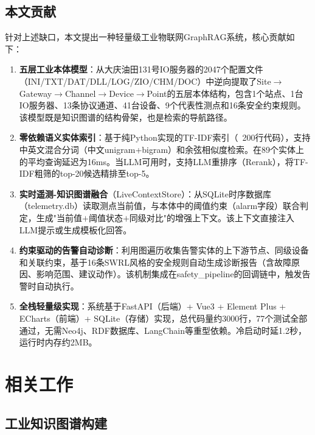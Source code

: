 \documentclass[12pt,a4paper]{article}
\begin{document}
\subsection{本文贡献}

针对上述缺口，本文提出一种轻量级工业物联网GraphRAG系统，核心贡献如下：

\begin{enumerate}
  \item \textbf{五层工业本体模型}：从大庆油田131号IO服务器的2047个配置文件（INI/TXT/DAT/DLL/LOG/ZIO/CHM/DOC）中逆向提取了Site$\to$Gateway$\to$Channel$\to$Device$\to$Point的五层本体结构，包含1个站点、1台IO服务器、13条协议通道、41台设备、9个代表性测点和16条安全约束规则。该模型既是知识图谱的结构骨架，也是检索的导航路径。

  \item \textbf{零依赖语义实体索引}：基于纯Python实现的TF-IDF索引（~200行代码），支持中英文混合分词（中文unigram+bigram）和余弦相似度检索。在89个实体上的平均查询延迟为16ms。当LLM可用时，支持LLM重排序（Rerank），将TF-IDF粗筛的top-20候选精排至top-5。

  \item \textbf{实时遥测-知识图谱融合}（LiveContextStore）：从SQLite时序数据库（telemetry.db）读取测点当前值，与本体中的阈值约束（alarm字段）联合判定，生成"当前值$+$阈值状态$+$同级对比"的增强上下文。该上下文直接注入LLM提示或生成模板化回答。

  \item \textbf{约束驱动的告警自动诊断}：利用图遍历收集告警实体的上下游节点、同级设备和关联约束，基于16条SWRL风格的安全规则自动生成诊断报告（含故障原因、影响范围、建议动作）。该机制集成在safety\_pipeline的回调链中，触发告警时自动执行。

  \item \textbf{全栈轻量级实现}：系统基于FastAPI（后端）+ Vue3 + Element Plus + ECharts（前端）+ SQLite（存储）实现，总代码量约3000行，77个测试全部通过，无需Neo4j、RDF数据库、LangChain等重型依赖。冷启动时延1.2秒，运行时内存约2MB。
\end{enumerate}

\section{相关工作}

\subsection{工业知识图谱构建}
\end{document}
